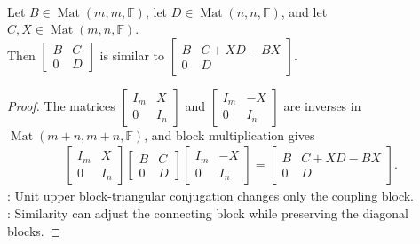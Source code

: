 \begin{proposition} \label{prop:upper-block-triangular-similarity-shift} \\
Let $B\in\operatorname{Mat}(m,m,\mathbb{F})$, let $D\in\operatorname{Mat}(n,n,\mathbb{F})$, and let $C,X\in\operatorname{Mat}(m,n,\mathbb{F})$.\\
Then $\begin{bmatrix}
B & C\\
0 & D
\end{bmatrix}
$ is similar to $\begin{bmatrix}
B & C+XD-BX\\
0 & D
\end{bmatrix}$.
\begin{proof}
The matrices $\begin{bmatrix} I_m & X\\ 0 & I_n \end{bmatrix}$ and $\begin{bmatrix} I_m & -X\\ 0 & I_n \end{bmatrix}$ are inverses in $\operatorname{Mat}(m+n,m+n,\mathbb{F})$, and block multiplication gives
\begin{align}
\begin{bmatrix}
I_m & X\\
0 & I_n
\end{bmatrix}
\begin{bmatrix}
B & C\\
0 & D
\end{bmatrix}
\begin{bmatrix}
I_m & -X\\
0 & I_n
\end{bmatrix}
=
\begin{bmatrix}
B & C+XD-BX\\
0 & D
\end{bmatrix}.
\nonumber
\end{align}
: Unit upper block-triangular conjugation changes only the coupling block.\\
: Similarity can adjust the connecting block while preserving the diagonal blocks.
\end{proof}
\end{proposition}

